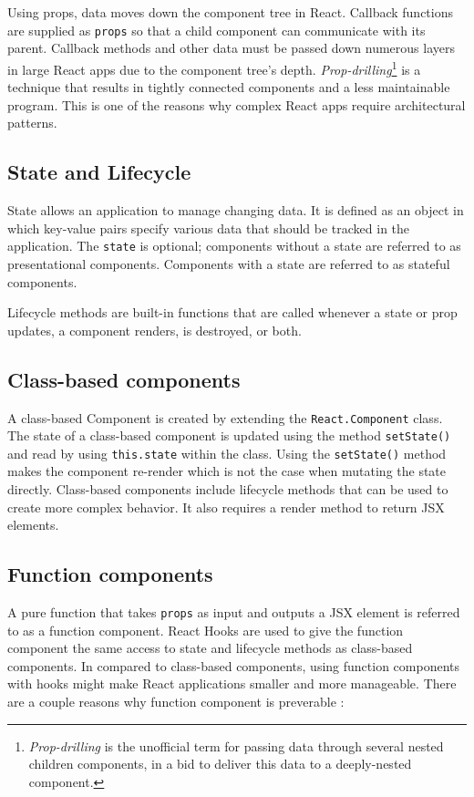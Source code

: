 Using props, data moves down the component tree in React. Callback functions are supplied as \texttt{props} so that a child component can communicate with its parent. Callback methods and other data must be passed down numerous layers in large React apps due to the component tree's depth. \emph{Prop-drilling}\footnote{\emph{Prop-drilling} is the unofficial term for passing data through several nested children components, in a bid to deliver this data to a deeply-nested component.} is a technique that results in tightly connected components and a less maintainable program. This is one of the reasons why complex React apps require architectural patterns.

\subsection{State and Lifecycle}
State allows an application to manage changing data. It is defined as an object in which key-value pairs specify various data that should be tracked in the application. The \texttt{state} is optional; components without a state are referred to as presentational components. Components with a state are referred to as stateful components.

Lifecycle methods are built-in functions that are called whenever a state or prop updates, a component renders, is destroyed, or both.

\subsection{Class-based components}
A class-based Component is created by extending the \texttt{React.Component} class. The state of a class-based component is updated using the method \texttt{setState()} and read by using \texttt{this.state} within the class. Using the \texttt{setState()} method makes the component re-render which is not the case when mutating the state directly. Class-based components include lifecycle methods that can be used to create more complex behavior. It also requires a render method to return JSX elements.


\subsection{Function components}
A pure function that takes \texttt{props} as input and outputs a JSX element is referred to as a function component. React Hooks are used to give the function component the same access to state and lifecycle methods as class-based components. In compared to class-based components, using function components with hooks might make React applications smaller and more manageable. There are a couple reasons why function component is preverable \autocite{phan2020react}:


